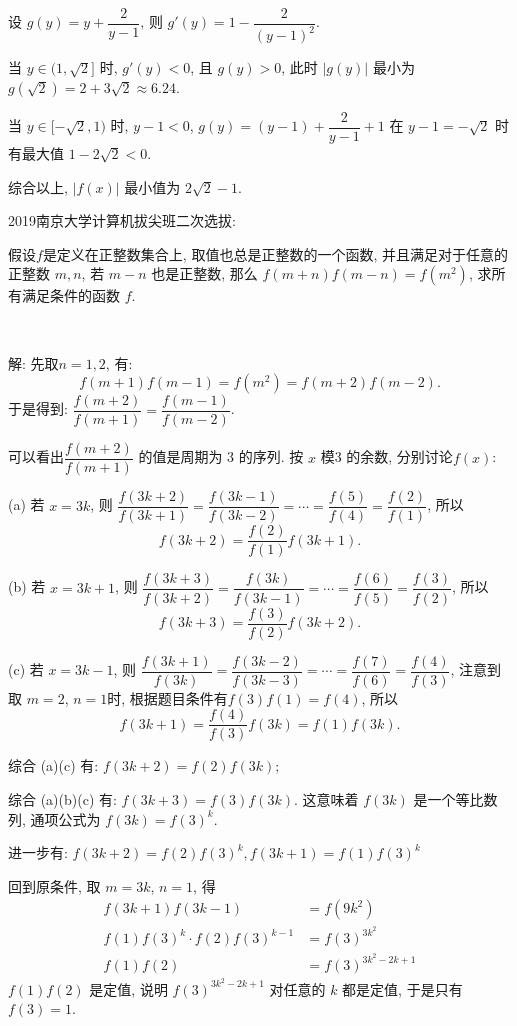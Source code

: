 设 $g(y) = y + \dfrac{2}{y-1}$, 则 $g'(y) = 1 - \dfrac{2}{(y-1)^2}$. 

当 $y\in(1,\sqrt{2}]$ 时, $g'(y) < 0$, 且 $g(y) > 0$, 此时 $|g(y)|$ 最小为 $g(\sqrt{2}) = 2+3\sqrt{2}\approx 6.24$. 

当 $y\in[-\sqrt{2},1)$ 时, $y - 1 < 0$, $g(y) = (y-1) + \dfrac{2}{y-1} + 1$ 在 $y-1 = -\sqrt{2}$ 时有最大值 $1-2\sqrt{2} < 0$.

综合以上, $|f(x)|$ 最小值为 $2\sqrt{2}-1$.

\newpage

\noindent 2019南京大学计算机拔尖班二次选拔:

假设$f$是定义在正整数集合上, 取值也总是正整数的一个函数, 并且满足对于任意的正整数 $m,n$, 若 $m-n$ 也是正整数, 那么 $f(m+n)f(m-n)=f(m^2)$, 求所有满足条件的函数 $f$.

~

解: 先取$n=1,2$, 有:
\[ f(m+1)f(m-1) = f(m^2) = f(m+2)f(m-2) .\]
于是得到: $\dfrac{f(m+2)}{f(m+1)} = \dfrac{f(m-1)}{f(m-2)}$. 

可以看出$\dfrac{f(m+2)}{f(m+1)}$ 的值是周期为 3 的序列. 按 $x$ 模3 的余数, 分别讨论$f(x)$:

(a) 若 $x=3k$, 则 $\dfrac{f(3k+2)}{f(3k+1)} = \dfrac{f(3k-1)}{f(3k-2)} = \cdots = \dfrac{f(5)}{f(4)} = \dfrac{f(2)}{f(1)}$, 所以
\[f(3k+2) = \dfrac{f(2)}{f(1)}f(3k+1) .\]

(b) 若 $x=3k+1$, 则 $\dfrac{f(3k+3)}{f(3k+2)} = \dfrac{f(3k)}{f(3k-1)} = \cdots = \dfrac{f(6)}{f(5)} = \dfrac{f(3)}{f(2)}$, 所以
\[f(3k+3) = \dfrac{f(3)}{f(2)}f(3k+2) .\]

(c) 若 $x=3k-1$, 则 $\dfrac{f(3k+1)}{f(3k)} = \dfrac{f(3k-2)}{f(3k-3)} = \cdots = \dfrac{f(7)}{f(6)} = \dfrac{f(4)}{f(3)}$, 注意到取 $m=2$, $n=1$时, 根据题目条件有$f(3)f(1)=f(4)$, 所以
\[f(3k+1) = \dfrac{f(4)}{f(3)}f(3k) = f(1)f(3k) .\]

综合 (a)(c) 有: $f(3k+2)=f(2)f(3k)$; 

综合 (a)(b)(c) 有: $f(3k+3) = f(3)f(3k)$. 这意味着 $f(3k)$ 是一个等比数列, 通项公式为 $f(3k)=f(3)^k$.

进一步有: $f(3k+2)=f(2)f(3)^k, f(3k+1) = f(1)f(3)^k$

回到原条件, 取 $m=3k$, $n=1$, 得 
\begin{align*}
f(3k+1)f(3k-1) &=f(9k^2) \\
f(1)f(3)^k \cdot f(2)f(3)^{k-1} &= f(3)^{3k^2}\\
f(1)f(2) &= f(3)^{3k^2-2k+1}
\end{align*} 
$f(1)f(2)$ 是定值, 说明 $f(3)^{3k^2-2k+1}$ 对任意的 $k$ 都是定值, 于是只有 $f(3)=1$. 

